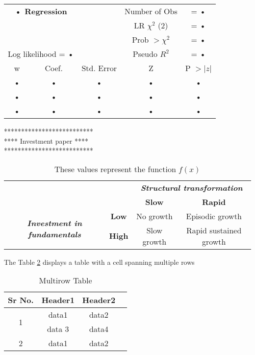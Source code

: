 \documentclass[12pt,letterpaper]{article}
\begin{document}
\begin{table}[H]
\def\arraystretch {1.5}
\centering
\begin{tabular}{c|c c c c }
\multicolumn{2}{c}{\textbf{• Regression}}  & & Number of Obs 	& = •\\
\multicolumn{2}{c}{} 					   & & LR $\chi^2$ (2) & = •\\
\multicolumn{2}{c}{} 					   & & Prob $ >\chi^2$	& = •\\
\multicolumn{2}{c}{Log likelihood = •}     & & Pseudo $R^2$ 	& = •\\
\hline
w & Coef. & Std. Error & Z & P $> |z| $ \\
\hline
• & • & • & • & •\\
• & • & • & • & •\\
• & • & • & • & •\\
\hline
\end{tabular}
\end{table}


**************************\\
**** Investment paper ****\\
**************************\\

\begin{table}[H]
\def\arraystretch {1.5}
\centering


\begin{tabular}{|c|c|c|c|}
\hline 
\hline 
\multicolumn{2}{|c|}{} & \multicolumn{2}{|c|}{\textbf{\textit{Structural transformation}}} \\ 
\cline{3-4} 
\multicolumn{2}{|c|}{} & \textbf{Slow} & \textbf{Rapid} \\ 
\hline 
\multirow{2}{*}{\textbf{\textit{Investment in fundamentals}}}  & \textbf{Low} &  No growth & Episodic growth \\ 
\cline{2-4}
											& \textbf{High}  & Slow growth & Rapid sustained growth \\ 
\hline
\hline 
\end{tabular} 

\caption{These values represent the function $f(x)$}
\label{tab: data 1}
\end{table}


The Table \ref{multirow_table} displays a table with a cell spanning multiple rows
		\begin{table} [ht]
			\centering
			\scalebox{1.5}
			{
			\begin{tabular}{|c|c|c|c|}
			\hline
			Sr No. & Header1 & Header2 \\
			\hline
			\multirow{2}{*}{1} & data1 & data2 \\
									 & data 3 & data4 \\
			\hline
			2 & data1 & data2 \\
			\hline
			\end{tabular}						
			}
			\caption{Multirow Table}
			\label{multirow_table}
		\end{table}
\end{document}
